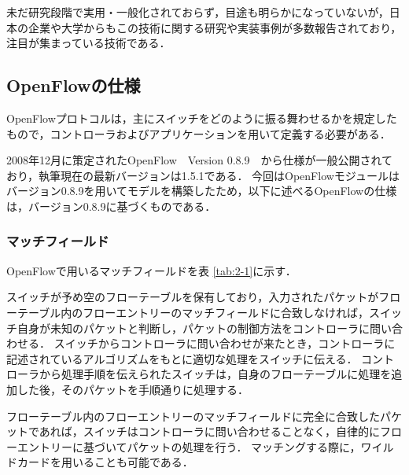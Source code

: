 未だ研究段階で実用・一般化されておらず，目途も明らかになっていないが，日本の企業や大学からもこの技術に関する研究や実装事例が多数報告されており，注目が集まっている技術である．

\subsection{OpenFlowの仕様}

OpenFlowプロトコルは，主にスイッチをどのように振る舞わせるかを規定したもので，コントローラおよびアプリケーションを用いて定義する必要がある．

2008年12月に策定されたOpenFlow　Version 0.8.9\cite{openflow}　から仕様が一般公開されており，執筆現在の最新バージョンは1.5.1である．
今回はOpenFlowモジュールはバージョン0.8.9を用いてモデルを構築したため，以下に述べるOpenFlowの仕様は，バージョン0.8.9に基づくものである．

\subsubsection{マッチフィールド}

OpenFlowで用いるマッチフィールドを表 \ref{tab:2-1}に示す\cite{openflow}．

スイッチが予め空のフローテーブルを保有しており，入力されたパケットがフローテーブル内のフローエントリーのマッチフィールドに合致しなければ，スイッチ自身が未知のパケットと判断し，パケットの制御方法をコントローラに問い合わせる．
スイッチからコントローラに問い合わせが来たとき，コントローラに記述されているアルゴリズムをもとに適切な処理をスイッチに伝える．
コントローラから処理手順を伝えられたスイッチは，自身のフローテーブルに処理を追加した後，そのパケットを手順通りに処理する．

フローテーブル内のフローエントリーのマッチフィールドに完全に合致したパケットであれば，スイッチはコントローラに問い合わせることなく，自律的にフローエントリーに基づいてパケットの処理を行う．
マッチングする際に，ワイルドカードを用いることも可能である．

